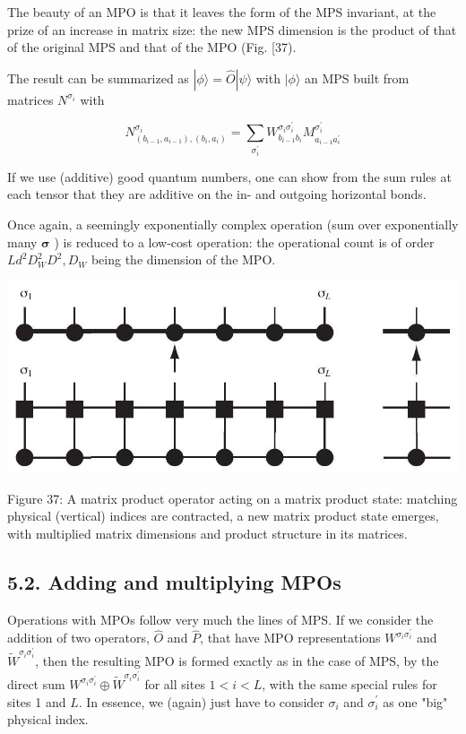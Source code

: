 \documentclass[12pt]{article}
\begin{document}
The beauty of an MPO is that it leaves the form of the MPS invariant, at the prize of an increase in matrix size: the new MPS dimension is the product of that of the original MPS and that of the MPO (Fig. [37).

The result can be summarized as $|\phi\rangle=\hat{O}|\psi\rangle$ with $|\phi\rangle$ an MPS built from matrices $N^{\sigma_{i}}$ with


\begin{equation*}
N_{\left(b_{i-1}, a_{i-1}\right),\left(b_{i}, a_{i}\right)}^{\sigma_{i}}=\sum_{\sigma_{i}^{\prime}} W_{b_{i-1} b_{i}}^{\sigma_{i} \sigma_{i}^{\prime}} M_{a_{i-1} a_{i}^{\prime}}^{\sigma_{i}^{\prime}} \tag{179}
\end{equation*}


If we use (additive) good quantum numbers, one can show from the sum rules at each tensor that they are additive on the in- and outgoing horizontal bonds.

Once again, a seemingly exponentially complex operation (sum over exponentially many $\boldsymbol{\sigma}$ ) is reduced to a low-cost operation: the operational count is of order $L d^{2} D_{W}^{2} D^{2}, D_{W}$ being the dimension of the MPO.

\begin{center}
\includegraphics[max width=\textwidth]{2024_05_04_afc4ad226da9ccfe0ac8g-058}
\end{center}

Figure 37: A matrix product operator acting on a matrix product state: matching physical (vertical) indices are contracted, a new matrix product state emerges, with multiplied matrix dimensions and product structure in its matrices.

\subsection*{5.2. Adding and multiplying MPOs}
Operations with MPOs follow very much the lines of MPS. If we consider the addition of two operators, $\hat{O}$ and $\hat{P}$, that have MPO representations $W^{\sigma_{i} \sigma_{i}^{\prime}}$ and $\tilde{W}^{\sigma_{i} \sigma_{i}^{\prime}}$, then the resulting MPO is formed exactly as in the case of MPS, by the direct sum $W^{\sigma_{i} \sigma_{i}^{\prime}} \oplus \tilde{W}^{\sigma_{i} \sigma_{i}^{\prime}}$ for all sites $1<i<L$, with the same special rules for sites 1 and $L$. In essence, we (again) just have to consider $\sigma_{i}$ and $\sigma_{i}^{\prime}$ as one "big" physical index.
\end{document}
